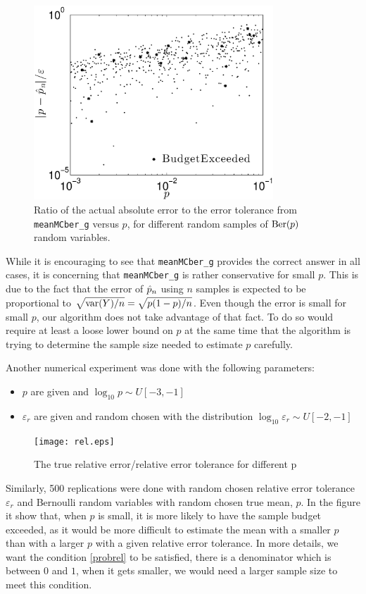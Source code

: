 \documentclass{iitthesis}
\begin{document}
  \begin{figure}[htbp]
    \centering
    \includegraphics[width=9cm]{abs.eps} %
    \caption{Ratio of the actual absolute error to the error tolerance from {\tt meanMCber\_g} versus $p$, for different random samples of $\operatorname{Ber}(p)$ random variables.}
    \label{fig:abserrex}
 \end{figure}
 
While it is encouraging to see that {\tt meanMCber\_g} provides the correct answer in all cases, it is concerning that {\tt meanMCber\_g} is rather conservative for small $p$.  This is due to the fact that the error of $\hat{p}_n$ using $n$ samples is expected to be proportional to $\sqrt{\operatorname{var}(Y)/n}=\sqrt{p(1-p)/n}$.  Even though the error is small for small $p$, our algorithm does not take advantage of that fact.  To do so would require at least a loose lower bound on $p$ at the same time that the algorithm is trying to determine the sample size needed to estimate $p$ carefully.

Another numerical experiment was done with the following parameters:
\begin{itemize}
\item $p$ are given and $\log_{10} p \sim U [-3,-1]$
\item $\varepsilon_r$ are given and random chosen with the distribution $\log_{10} \varepsilon_r \sim U[-2,-1]$
\end{itemize}
  \begin{figure}[htbp]
    \centering
    \texttt{[image: rel.eps]} %
    \caption{The true relative error/relative error tolerance for different p}
    \label{fig:relerrex}
 \end{figure}
  Similarly, 500 replications were done with random chosen relative error tolerance $\varepsilon_r$ and Bernoulli random variables with random chosen true mean, $p$. In the figure it show that, when $p$ is small, it is more likely to have the sample budget exceeded, as it would be more difficult to estimate the mean with a smaller $p$ than with a larger $p$ with a given relative error tolerance. In more details, we want the condition \eqref{probrel} to be satisfied, there is a denominator which is between $0$ and $1$,  when it gets smaller, we would need a larger sample size to meet this condition.
\end{document}
